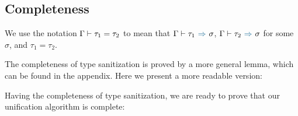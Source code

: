 \begin{lemma}[\UnificationEquivalenceName]\leavevmode
  \UnificationEquivalenceBody
\end{lemma}

\subsection{Completeness}

We use the notation $\Gamma \vdash \tau_1 = \tau_2$ to mean that
$\tctx \byinf \tau_1 \infto \sigma$, $\tctx \byinf \tau_2 \infto \sigma$ for
some $\sigma$,
and $\tau_1 = \tau_2$.

The completeness of type sanitization is proved by a more general lemma, which
can be found in the appendix. Here we present a more readable version:

\begin{corollary}[\TypeSanitizationCompletenessPrettyName]
  \label{lemma:\TypeSanitizationCompletenessPrettyName}
  \TypeSanitizationCompletenessPrettyBody
\end{corollary}

Having the completeness of type sanitization, we are ready to prove that our
unification algorithm is complete:

\begin{lemma}[\UnificationCompletenessName]
  \label{lemma:\UnificationCompletenessName}
    \UnificationCompletenessBody
\end{lemma}

